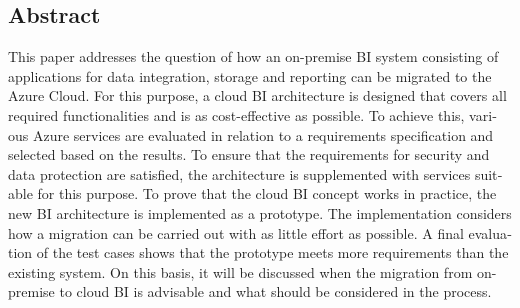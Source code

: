 
\begin{otherlanguage}{american}
	\chapter*{Abstract}
This paper addresses the question of how an on-premise BI system consisting of applications for data integration, storage and reporting can be migrated to the Azure Cloud. For this purpose, a cloud BI architecture is designed that covers all required functionalities and is as cost-effective as possible. To achieve this, various Azure services are evaluated in relation to a requirements specification and selected based on the results. To ensure that the requirements for security and data protection are satisfied, the architecture is supplemented with services suitable for this purpose. To prove that the cloud BI concept works in practice, the new BI architecture is implemented as a prototype. The implementation considers how a migration can be carried out with as little effort as possible.  A final evaluation of the test cases shows that the prototype meets more requirements than the existing system. On this basis, it will be discussed when the migration from on-premise to cloud BI is advisable and what should be considered in the process. \end{otherlanguage}